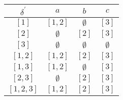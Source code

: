 
\begin{tabular}{c|ccc}
$\delta^\prime$ & $a$         & $b$         & $c$ \\\hline
$[1]$           & $[1, 2]$    & $\emptyset$ & $[3]$ \\[4pt]
$[2]$           & $\emptyset$ & $[2]$       & $[3]$ \\[4pt]
$[3]$           & $\emptyset$ & $\emptyset$ & $\emptyset$ \\[4pt]
$[1,2]$         & $[1,2]$     & $[2]$       & $[3]$ \\[4pt]
$[1,3]$         & $[1,2]$     & $\emptyset$ & $[3]$ \\[4pt]
$[2,3]$         & $\emptyset$ & $[2]$       & $[3]$ \\[4pt]
$[1,2,3]$       & $[1,2]$     & $[2]$       & $[3]$
\end{tabular}
